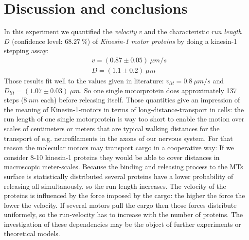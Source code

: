 \section{Discussion and conclusions}
	In this experiment we quantified the \textit{velocity} $v$ and the characteristic \textit{run length} $D$ (confidence level: $68.27\ \unit{\%}$) of \textit{Kinesin-1 motor proteins} by doing a kinesin-1 stepping assay:	
	\begin{align*}
	&v = (0.87 \pm 0.05)\ \unit{\mu m / s}\\
	&D = (1.1 \pm 0.2)\ \unit{\mu m}
	\end{align*} 
	Those results fit well to the values given in literature: $v_{lit} = 0.8\ \unit{\mu m/s}$\cite{PA} and $D_{lit} = (1.07 \pm 0.03)\ \unit{\mu m}$.\cite{runLength} So one single motorprotein does approximately 137 steps ($8\ \unit{nm}$ each) before releasing itself. Those quantities give an impression of the meaning of Kinesin-1-motors in terms of long-distance-transport in cells: the run length of one single motorprotein is way too short to enable the motion over scales of centimeters or meters that are typical walking distances for the transport of e.g. neurofilaments in the axons of our nervous system. For that reason the molecular motors may transport cargo in a cooperative way: If we consider 8-10 kinesin-1 proteins they would be able to cover distances in macroscopic meter-scales.\cite{severalMP} Because the binding and releasing process to the MTs surface is statistically distributed several proteins have a lower probability of releasing all simultanously, so the run length increases. The velocity of the proteins is influenced by the force imposed by the cargo: the higher the force the lower the velocity. If several motors pull the cargo then those forces distribute uniformely, so the run-velocity has to increase with the number of proteins. The investigation of these dependencies may be the object of further experiments or theoretical models.